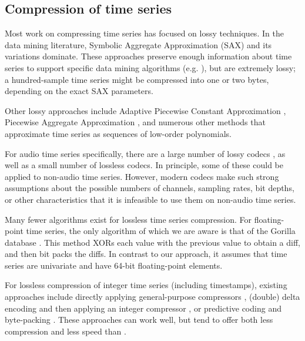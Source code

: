
\subsection{Compression of time series}

Most work on compressing time series has focused on lossy techniques. In the data mining literature, Symbolic Aggregate Approximation (SAX) \cite{sax} and its variations \cite{isax, isax2} dominate. These approaches preserve enough information about time series to support specific data mining algorithms (e.g. \cite{fastShapelet, hotSax}), but are extremely lossy; a hundred-sample time series might be compressed into one or two bytes, depending on the exact SAX parameters.

Other lossy approaches include Adaptive Piecewise Constant Approximation \cite{apca}, Piecewise Aggregate Approximation \cite{paa}, and numerous other methods \cite{swab, lemireSegmentation, tsCompressSmartGrid} that approximate time series as sequences of low-order polynomials.

For audio time series specifically, there are a large number of lossy codecs \cite{vorbis, shorten, aac, opus}, as well as a small number of lossless \cite{flac, alac} codecs. In principle, some of these could be applied to non-audio time series. However, modern codecs make such strong assumptions about the possible numbers of channels, sampling rates, bit depths, or other characteristics that it is infeasible to use them on non-audio time series.

Many fewer algorithms exist for lossless time series compression. For floating-point time series, the only algorithm of which we are aware is that of the Gorilla database \cite{gorilla}. This method XORs each value with the previous value to obtain a diff, and then bit packs the diffs. In contrast to our approach, it assumes that time series are univariate and have 64-bit floating-point elements. %

For lossless compression of integer time series (including timestamps), existing approaches include directly applying general-purpose compressors \cite{respawnDB, openTSDB, chronicleDB, kairosDB, druid}, (double) delta encoding and then applying an integer compressor \cite{influxDB, gorilla}, or predictive coding and byte-packing \cite{akumuli}. These approaches can work well, but tend to offer both less compression and less speed than \mine.

